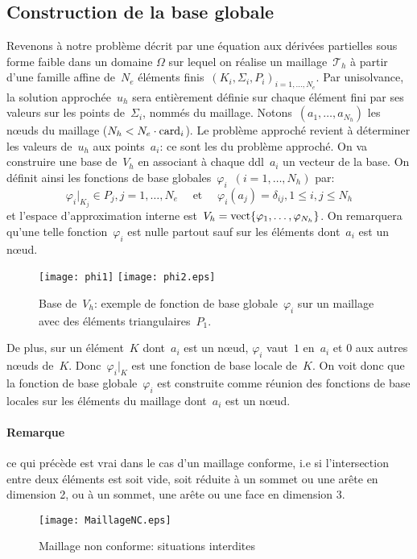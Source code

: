 \medskip
\subsection{Construction de la base globale}
Revenons à notre problème décrit par une équation aux dérivées partielles sous forme faible dans un domaine $\Omega$ sur lequel on réalise un maillage~$\mathcal{T}_h$ à partir d'une famille affine de~$N_e$ éléments finis~$(K_i, \Sigma_i, P_i)_{i=1,\ldots,N_e}$.
\medskip
Par unisolvance, la solution approchée~$u_h$ sera entièrement définie sur chaque élément fini par ses valeurs sur les points de~$\Sigma_i$, nommés  du maillage.
Notons~$(a_1,\ldots, a_{N_h})$ les nœuds du maillage ($N_h<N_e \cdot \mathrm{card}_i$).
Le problème approché revient à déterminer les valeurs de~$u_h$ aux points~$a_i$: ce sont les  du problème approché.
\medskip
On va construire une base de~$V_h$ en associant à chaque ddl~$a_i$ un vecteur de la base.
On définit ainsi les fonctions de base globales~$\varphi_i$~$(i = 1,\ldots, N_h)$ par:
\begin{equation}\varphi_i|_{K_j} \in P_j, j = 1,\ldots, N_e \quad \text{ et }\quad \varphi_i(a_j) = \delta_{ij}, 1\le i,j\le N_h\end{equation}
et l'espace d'approximation interne est~$V_h=\operatorname{vect}\{\varphi_1,\ldots, \varphi_{N_h}\}$.
On remarquera qu'une telle fonction~$\varphi_i$ est nulle partout sauf sur les éléments
dont~$a_i$ est un nœud.
\begin{figure}[ht]
\centering
\texttt{[image: phi1]} \hspace{5em} \texttt{[image: phi2.eps]}
\caption{\label{BaseVh} Base de~$V_h$: exemple de fonction de base globale~$\varphi_i$ sur un maillage avec des éléments triangulaires~$P_1$.}
\end{figure}

\medskip
De plus, sur un élément~$K$ dont~$a_i$ est un nœud, $\varphi_i$ vaut~$1$ en~$a_i$ et $0$ aux autres nœuds de~$K$. Donc~$\varphi_i|_K$ est une fonction de base locale de~$K$.
On voit donc que la fonction de base globale~$\varphi_i$ est construite comme réunion des fonctions de base locales sur les éléments du maillage dont~$a_i$ est un nœud.

\medskip
\paragraph{Remarque} ce qui précède est vrai dans le cas d'un maillage conforme, i.e si l'intersection entre deux éléments est soit vide, soit réduite à un sommet ou une arête en dimension 2, ou à un sommet, une arête ou une face en dimension 3.
\begin{figure}[ht]
\centering
\texttt{[image: MaillageNC.eps]}
\caption{Maillage non conforme: situations interdites}\label{maillageNC}
\end{figure}

